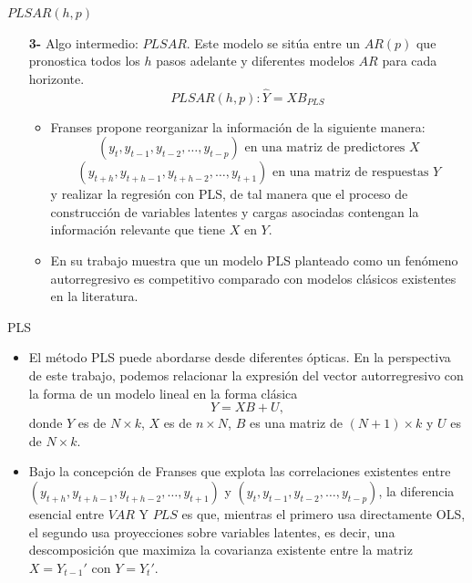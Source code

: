 \documentclass{beamer}
\newcommand{\?}{?`}
\begin{document}
\begin{frame}{$PLSAR(h,p)$}
  \begin{itemize}
  \item[\textbf{3-}] Algo intermedio: $PLSAR$. Este modelo se
    sit\'ua entre un $AR(p)$ que pronostica todos los $h$ pasos
    adelante y diferentes modelos $AR$ para cada horizonte.
    \begin{displaymath}
      PLSAR(h,p): \hat{Y}=XB_{PLS}
    \end{displaymath}
    \begin{itemize}
    \item Franses propone reorganizar la informaci\'on de la
      siguiente manera:
      \begin{displaymath}
        (y_{t},y_{t-1},y_{t-2},\ldots,y_{t-p}) \text{ en una matriz
          de predictores } X
      \end{displaymath}
      \begin{displaymath}
        (y_{t+h},y_{t+h-1},y_{t+h-2},\ldots,y_{t+1})
        \text{ en una matriz de respuestas } Y
      \end{displaymath}
      y realizar la regresi\'on con PLS, de tal manera que el
      proceso de construcci\'on de variables latentes y cargas
      asociadas contengan la informaci\'on relevante que tiene $X$
      en $Y$.
    \item En su trabajo muestra que un modelo PLS planteado como un
      fen\'omeno autorregresivo es competitivo comparado con modelos
      cl\'asicos existentes en la literatura.
    \end{itemize}
  \end{itemize}
\end{frame}

\begin{frame}{PLS}
  \begin{itemize}
  \item El m\'etodo PLS puede abordarse desde diferentes \'opticas. En
    la perspectiva de este trabajo, podemos relacionar la expresi\'on
    del vector autorregresivo con la forma de un modelo lineal en la
    forma cl\'asica
    \begin{displaymath}
      Y=XB+U,
    \end{displaymath}
    donde $Y$ es de $N\times k$, $X$ es de $n\times N$, $B$ es una
    matriz de $(N+1)\times k$ y $U$ es de $N\times k$.
  \item Bajo la concepci\'on de Franses que explota las correlaciones
    existentes entre $(y_{t+h},y_{t+h-1},y_{t+h-2},\ldots,y_{t+1})$ y
    $(y_{t},y_{t-1},y_{t-2},\ldots,y_{t-p})$, la diferencia esencial
    entre $VAR$ Y $PLS$ es que, mientras el primero usa directamente
    OLS, el segundo usa proyecciones sobre variables latentes, es
    decir, una descomposici\'on que maximiza la covarianza existente
    entre la matriz $X=Y_{t-1}'$ con $Y=Y_{t}'$.
  \end{itemize}
\end{frame}
\end{document}

